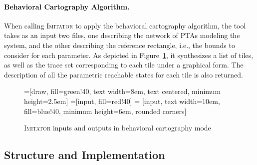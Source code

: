\documentclass[a4paper,10pt]{article}
\newcommand{\A}{\mathcal{A}}
\newcommand{\imitator}{\textsc{Imitator}}
\newcommand{\paragraphe}[1]{\paragraph{#1.}}
\begin{document}
\paragraphe{Behavioral Cartography Algorithm}
When calling \imitator{} to apply the behavioral cartography algorithm, the tool takes as an input two files, one describing the network of PTAs modeling the system, and the other describing the reference rectangle, i.e., the bounds to consider for each parameter.
As depicted in Figure~\ref{fig:ioBC}, it synthesizes a list of tiles, as well as the trace set corresponding to each tile under a graphical form.
The description of all the parametric reachable states for each tile is also returned.

\begin{figure}[ht!]
=[draw, fill=green!40, text width=8em,
    text centered, minimum height=2.5em]
=[input, fill=red!40]
 = [input, text width=10em, fill=blue!40,
    minimum height=6em, rounded corners]
\def\blockdist{2.3}
\def\edgedist{2.5}

{

\centering


}

\caption{\imitator{} inputs and outputs in behavioral cartography mode}
\label{fig:ioBC}
\end{figure}



\subsection{Structure and Implementation}
\end{document}
